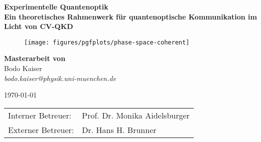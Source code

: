\makeatletter
\begin{titlepage}
    \begin{otherlanguage}{ngerman}
		\begin{center}
			\large
			    \textbf{\textsf{Experimentelle Quantenoptik}}\\
		    \vspace{0.8em}
			\huge
		    \textbf{\textsf{Ein theoretisches Rahmenwerk für quantenoptische Kommunikation im Licht von CV-QKD}}\\
			
			\vspace{1.2em}
			\begin{figure}[htb]
				\centering
			    \texttt{[image: figures/pgfplots/phase-space-coherent]}
			\end{figure}
			
			\vspace{.6em}
		    \large
		    \textbf{Masterarbeit von}\\
			\vspace{.8em}
		    \large
			Bodo Kaiser\\
		    \vspace{.2em}
			\textit{bodo.kaiser@physik.uni-muenchen.de}
	
		    \large
		    \today
	
		    \vspace{1.9em}
			\normalsize
			\begin{tabular}{ll}
			Interner Betreuer: & Prof. Dr. Monika Aidelsburger \\
			Externer Betreuer: & Dr. Hans H. Brunner \\
			\end{tabular}
		\end{center}
    \end{otherlanguage}
\end{titlepage}
\makeatother